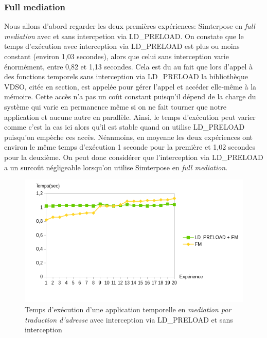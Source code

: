 \subsubsection{Full mediation}
Nous allons d'abord regarder les deux premières expériences: Simterpose en \textit{full mediation} avec et sans intercpetion via LD\_PRELOAD. On constate que le temps d'exécution avec interception via LD\_PRELOAD est plus ou moins constant (environ 1,03 secondes), alors que celui sans interception varie énormément, entre 0,82 et 1,13 secondes. Cela est du au fait que lors d'appel à des fonctions temporels sans interception via LD\_PRELOAD la bibliothèque VDSO, citée en section, est appelée pour gérer l'appel et accéder elle-même à la mémoire. Cette accès n'a pas un coût constant puisqu'il dépend de la charge du système qui varie en permanence même si on ne fait tourner que notre application et aucune autre en parallèle. Ainsi, le temps d'exécution peut varier comme c'est la cas ici alors qu'il est stable quand on utilise LD\_PRELOAD puisqu'on empèche ces accès. Néanmoins, en moyenne les deux expériences ont environ le même temps d'exécution 1 seconde pour la première et 1,02 secondes pour la deuxième. On peut donc considérer que l'interception via LD\_PRELOAD a un surcoût négligeable lorsqu'on utilise Simterpose en \textit{full mediation}.

\begin{figure}
  \centering
    \includegraphics[scale=0.80]{mesures/graph/Temps_FM.png}
    \caption{Temps d'exécution d'une application temporelle en \textit{mediation par traduction d'adresse} avec interception via LD\_PRELOAD et sans interception}
    \label{Temps_FM}
\end{figure}

